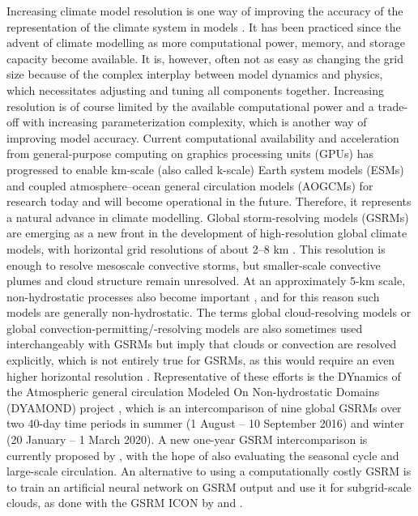 \documentclass[12pt,a4paper]{article}
\begin{document}
Increasing climate model resolution is one way of improving the accuracy of
the representation of the climate system in models \citep{mauritsen2022}. It has been
practiced since the advent of climate modelling as more computational power,
memory, and storage capacity become available. It is, however, often not as
easy as changing the grid size because of the complex interplay between model
dynamics and physics, which necessitates adjusting and tuning all components
together. Increasing resolution is of course limited by the available
computational power and a trade-off with increasing parameterization
complexity, which is another way of improving model accuracy. Current
computational availability and acceleration from general-purpose computing on
graphics processing units (GPUs) has progressed to enable km-scale (also called
k-scale) Earth system models (ESMs) and coupled atmosphere--ocean general
circulation models (AOGCMs) for research today and will become operational in
the future. Therefore, it represents a natural advance in climate
modelling. Global storm-resolving models (GSRMs) are emerging as a new front
in the development of high-resolution global climate models, with horizontal
grid resolutions of about 2--8 km \citep{satoh2019,stevens2019}. This resolution is enough
to resolve mesoscale convective storms, but smaller-scale convective plumes and
cloud structure remain unresolved. At an approximately 5-km scale,
non-hydrostatic processes also become important \citep{weisman1997}, and for
this reason such models are generally non-hydrostatic. The terms global
cloud-resolving models or global convection-permitting/-resolving models are
also sometimes used interchangeably with GSRMs but imply that clouds or
convection are resolved explicitly, which is not entirely true for GSRMs, as
this would require an even higher horizontal resolution \citep{satoh2019}.
Representative of these efforts is the DYnamics of the Atmospheric general
circulation Modeled On Non-hydrostatic Domains (DYAMOND) project
\citep{stevens2019,dyamond}, which is an intercomparison of nine global GSRMs
over two 40-day time periods in summer (1 August -- 10 September 2016) and
winter (20 January -- 1 March 2020). A new one-year GSRM intercomparison is
currently proposed by \cite{takasuka2024}, with the hope of also evaluating the
seasonal cycle and large-scale circulation.  An alternative to using a
computationally costly GSRM is to train an artificial neural network on GSRM
output and use it for subgrid-scale clouds, as done with the GSRM ICON by
\cite{grundner2022} and \cite{grundner2023}.
\end{document}
